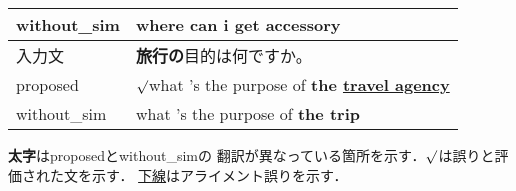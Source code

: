 \begin{table}
\begin{center}
\begin{tabular}{ll}
{\sc without\_sim} & where can i \textbf{get accessory}\\
\hline
入力文             & \textbf{旅行の}目的は何ですか。\\
{\sc proposed}     & $\surd$what 's the purpose of \textbf{the \underline{travel agency}}\\
{\sc without\_sim} & what 's the purpose of \textbf{the trip}\\
\hline
\hline
\end{tabular}
\end{center}
{\footnotesize * \textbf{太字}は{\sc proposed}と{\sc without\_sim}の
翻訳が異なっている箇所を示す．$\surd$は誤りと評価された文を示す．
\underline{下線}はアライメント誤りを示す．}
\end{table}



	
	
